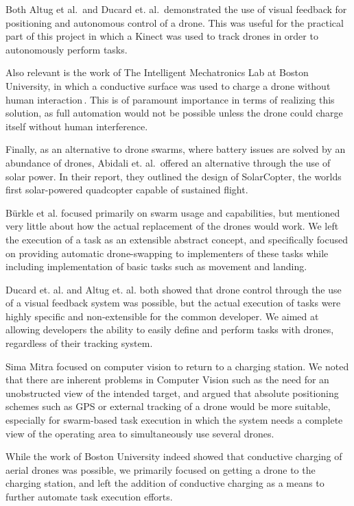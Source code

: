 Both Altug et al.\,\cite{altugetal} and Ducard et. al.\,\cite{ducardetal} demonstrated the use of visual feedback for positioning and autonomous control of a drone. This was useful for the practical part of this project in which a Kinect was used to track drones in order to autonomously perform tasks.

Also relevant is the work of The Intelligent Mechatronics Lab at Boston University, in which a conductive surface was used to charge a drone without human interaction\,\cite{bostonuni}. This is of paramount importance in terms of realizing this solution, as full automation would not be possible unless the drone could charge itself without human interference.

Finally, as an alternative to drone swarms, where battery issues are solved by an abundance of drones, Abidali et. al.\,\cite{solarcopter} offered an alternative through the use of solar power. In their report, they outlined the design of SolarCopter, the worlds first solar-powered quadcopter capable of sustained flight.

B\"urkle et al. focused primarily on swarm usage and capabilities, but mentioned very little about how the actual replacement of the drones would work. We left the execution of a task as an extensible abstract concept, and specifically focused on providing automatic drone-swapping to implementers of these tasks while including implementation of basic tasks such as movement and landing.

Ducard et. al. and Altug et. al. both showed that drone control through the use of a visual feedback system was possible, but the actual execution of tasks were highly specific and non-extensible for the common developer. We aimed at allowing developers the ability to easily define and perform tasks with drones, regardless of their tracking system.

Sima Mitra focused on computer vision to return to a charging station. We noted that there are inherent problems in Computer Vision such as the need for an unobstructed view of the intended target, and argued that absolute positioning schemes such as GPS or external tracking of a drone would be more suitable, especially for swarm-based task execution in which the system needs a complete view of the operating area to simultaneously use several drones.

While the work of Boston University indeed showed that conductive charging of aerial drones was possible, we primarily focused on getting a drone to the charging station, and left the addition of conductive charging as a means to further automate task execution efforts.

